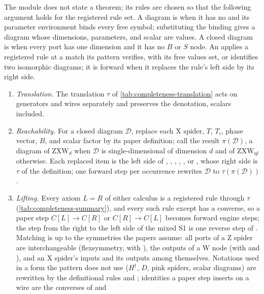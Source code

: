 The module does not state a theorem; its rules are chosen so that the following argument holds
for the registered rule set. A diagram is  when it has no \bbox{} and its parameter
environment binds every free symbol; substituting the binding gives a diagram whose dimensions,
parameters, and scalar are values. A closed diagram is  when every port
has one dimension and it has no $B$ or $S$ node. An  applies a registered rule at
a match its pattern verifies, with its free values set, or identifies two isomorphic diagrams;
it is forward when it replaces the rule's left side by its right side.

\begin{enumerate}
\item \emph{Translation.} The translation $\tau$ of \cref{tab:completeness-translation} acts on
  generators and wires separately and preserves the denotation, scalars included.
\item \emph{Reachability.} For a closed diagram $\mathcal D$, replace each X spider, $T$, $T_i$,
  phase vector, $B$, and scalar factor by its paper definition; call the result $\pi(\mathcal D)$,
  a diagram of $\mathrm{ZXW}_d$ when $\mathcal D$ is single-dimensional of dimension $d$ and of
  $\mathrm{ZXW}_{\mathrm{qf}}$ otherwise. Each replaced item is the left side of
  , , ,
  , , or , whose right side is
  $\tau$ of the definition; one forward step per occurrence rewrites $\mathcal D$ to
  $\tau(\pi(\mathcal D))$.
\item \emph{Lifting.} Every axiom $L=R$ of either calculus is a registered rule through $\tau$
  (\cref{tab:completeness-summary}), and every such rule except  has a converse, so a
  paper step $C[L]\to C[R]$ or $C[R]\to C[L]$ becomes forward engine steps; the step from the right
  to the left side of the mixed S1 is one reverse step of . Matching is up to the
  symmetries the papers assume: all ports of a Z spider are interchangeable (flexsymmetry, with
  ), the outputs of a W node (with  and ), and an X
  spider's inputs and its outputs among themselves. Notations used in a form the pattern does not
  use ($H^\dagger$, $D$, pink spiders, scalar diagrams) are rewritten by the definitional rules and
  ; identities a paper step inserts on a wire are the converses of  and

\end{enumerate}
